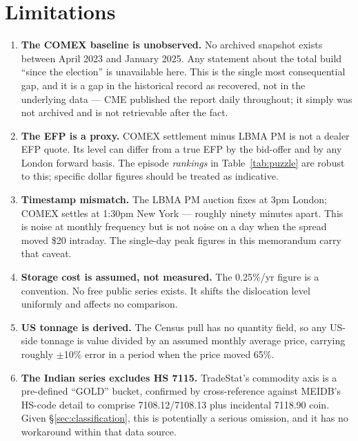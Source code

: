 \documentclass[11pt,a4paper]{article}
\begin{document}
\section{Limitations}
\label{sec:limits}

\begin{enumerate}[leftmargin=*]

\item \textbf{The COMEX baseline is unobserved.} No archived snapshot exists between April 2023
and January 2025. Any statement about the total build ``since the election'' is unavailable
here. This is the single most consequential gap, and it is a gap in the historical record as
recovered, not in the underlying data --- CME published the report daily throughout; it simply
was not archived and is not retrievable after the fact.

\item \textbf{The EFP is a proxy.} COMEX settlement minus LBMA PM is not a dealer EFP quote.
Its level can differ from a true EFP by the bid-offer and by any London forward basis. The
episode \emph{rankings} in Table~\ref{tab:puzzle} are robust to this; specific dollar figures
should be treated as indicative.

\item \textbf{Timestamp mismatch.} The LBMA PM auction fixes at 3pm London; COMEX settles at
1:30pm New York --- roughly ninety minutes apart. This is noise at monthly frequency but is not
noise on a day when the spread moved \$20 intraday. The single-day peak figures in this
memorandum carry that caveat.

\item \textbf{Storage cost is assumed, not measured.} The 0.25\%/yr figure is a convention. No
free public series exists. It shifts the dislocation level uniformly and affects no comparison.

\item \textbf{US tonnage is derived.} The Census pull has no quantity field, so any US-side
tonnage is value divided by an assumed monthly average price, carrying roughly $\pm$10\% error
in a period when the price moved 65\%.

\item \textbf{The Indian series excludes HS 7115.} TradeStat's commodity axis is a pre-defined
``GOLD'' bucket, confirmed by cross-reference against MEIDB's HS-code detail to comprise
7108.12/7108.13 plus incidental 7118.90 coin. Given \S\ref{sec:classification}, this is
potentially a serious omission, and it has no workaround within that data source.


\end{enumerate}
\end{document}
